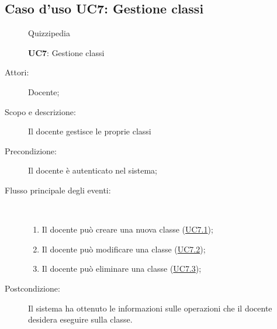 \subsection{Caso d'uso UC7: Gestione classi}
	\begin{figure}[H]
		\centering
		\begin{resizedtikzpicture}{\textwidth}
		\begin{umlsystem}[x=0, fill=lightgray!20]{Quizzipedia}
		\end{umlsystem}
		\end{resizedtikzpicture}
		\caption{\textbf{UC7}: Gestione classi}
		\label{UC7}
	\end{figure}
\begin{description}
\item[Attori:] Docente;
\item[Scopo e descrizione:] Il docente gestisce le proprie classi
      \item[Precondizione:] Il docente è autenticato nel sistema;

        \item[Flusso principale degli eventi:] \ 
 \begin{enumerate}
          \item Il docente può creare una nuova classe (\hyperlink{UC7.1}{UC7.1});
          \item Il docente può modificare una classe (\hyperlink{UC7.2}{UC7.2});
          \item Il docente può eliminare una classe (\hyperlink{UC7.3}{UC7.3});

      \end{enumerate}
    \item[Postcondizione:] Il sistema ha ottenuto le informazioni sulle operazioni che il docente desidera eseguire sulla classe.
  \end{description}
\hypertarget{UC7.1}{}
